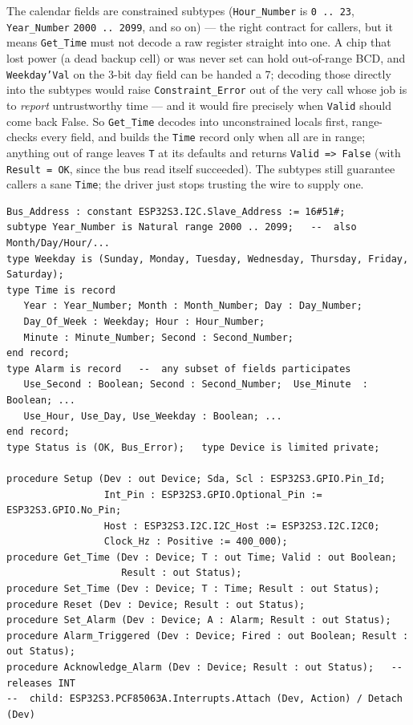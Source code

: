 The calendar fields are constrained subtypes (\texttt{Hour\_Number} is
\texttt{0\,..\,23}, \texttt{Year\_Number} \texttt{2000\,..\,2099}, and so on) ---
the right contract for callers, but it means \texttt{Get\_Time} must not decode a
raw register straight into one. A chip that lost power (a dead backup cell) or was
never set can hold out-of-range BCD, and \texttt{Weekday'Val} on the 3-bit day field
can be handed a 7; decoding those directly into the subtypes would raise
\texttt{Constraint\_Error} out of the very call whose job is to \emph{report}
untrustworthy time --- and it would fire precisely when \texttt{Valid} should come
back False. So \texttt{Get\_Time} decodes into unconstrained locals first,
range-checks every field, and builds the \texttt{Time} record only when all are in
range; anything out of range leaves \texttt{T} at its defaults and returns
\texttt{Valid => False} (with \texttt{Result = OK}, since the bus read itself
succeeded). The subtypes still guarantee callers a sane \texttt{Time}; the driver
just stops trusting the wire to supply one.

\begin{lstlisting}
Bus_Address : constant ESP32S3.I2C.Slave_Address := 16#51#;
subtype Year_Number is Natural range 2000 .. 2099;   --  also Month/Day/Hour/...
type Weekday is (Sunday, Monday, Tuesday, Wednesday, Thursday, Friday, Saturday);
type Time is record
   Year : Year_Number; Month : Month_Number; Day : Day_Number;
   Day_Of_Week : Weekday; Hour : Hour_Number;
   Minute : Minute_Number; Second : Second_Number;
end record;
type Alarm is record   --  any subset of fields participates
   Use_Second : Boolean; Second : Second_Number;  Use_Minute  : Boolean; ...
   Use_Hour, Use_Day, Use_Weekday : Boolean; ...
end record;
type Status is (OK, Bus_Error);   type Device is limited private;

procedure Setup (Dev : out Device; Sda, Scl : ESP32S3.GPIO.Pin_Id;
                 Int_Pin : ESP32S3.GPIO.Optional_Pin := ESP32S3.GPIO.No_Pin;
                 Host : ESP32S3.I2C.I2C_Host := ESP32S3.I2C.I2C0;
                 Clock_Hz : Positive := 400_000);
procedure Get_Time (Dev : Device; T : out Time; Valid : out Boolean;
                    Result : out Status);
procedure Set_Time (Dev : Device; T : Time; Result : out Status);
procedure Reset (Dev : Device; Result : out Status);
procedure Set_Alarm (Dev : Device; A : Alarm; Result : out Status);
procedure Alarm_Triggered (Dev : Device; Fired : out Boolean; Result : out Status);
procedure Acknowledge_Alarm (Dev : Device; Result : out Status);   --  releases INT
--  child: ESP32S3.PCF85063A.Interrupts.Attach (Dev, Action) / Detach (Dev)
\end{lstlisting}

